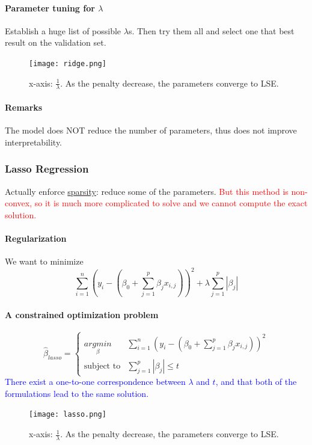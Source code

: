 \documentclass[11pt]{article}
\newcommand{\under}[1]{\underline{#1}}
\begin{document}
\paragraph{Parameter tuning for $\lambda$}
Establish a huge list of possible $\lambda$s. Then try them all and select one that best result on the validation set.
\begin{figure}[h]
	\centering
	\texttt{[image: ridge.png]}
	\caption{x-axis: $\frac{1}{\lambda}$. As the penalty decrease, the parameters converge to LSE.}
\end{figure}

\paragraph{Remarks}
The model does NOT reduce the number of parameters, thus does not improve interpretability.

\subsubsection{Lasso Regression}
Actually enforce \under{sparsity}: reduce some of the parameters. \textcolor{red}{But this method is non-convex, so it is much more complicated to solve and we cannot compute the exact solution.}
\paragraph{Regularization}
We want to minimize
$$ 
\sum_{i=1}^n(y_i - (\beta_0 + \sum_{j=1}^p \beta_j x_{i,j}))^2 + \lambda \sum_{j=1}^p |\beta_j|$$
\paragraph{A constrained optimization problem}
$$ \hat{\beta}_{lasso} = \begin{cases}
 \underset{\beta}{argmin} & 	\sum_{i=1}^n(y_i - (\beta_0 + \sum_{j=1}^p \beta_j x_{i,j}))^2 
 \\
 \text{subject to} & \sum_{j=1}^p |\beta_j| \leq t
 \end{cases} $$
 \textcolor{blue}{There exist a one-to-one correspondence between $\lambda$ and $t$, and that both of the formulations lead to the same solution.}
 
 \begin{figure}[h]
	\centering
	\texttt{[image: lasso.png]}
	\caption{x-axis: $\frac{1}{\lambda}$. As the penalty decrease, the parameters converge to LSE.}
\end{figure}
\end{document}
